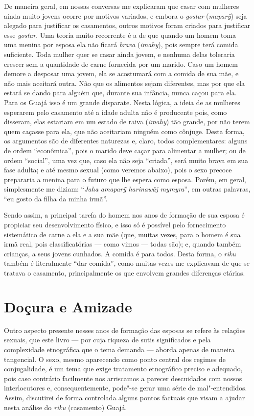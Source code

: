 De maneira geral, em nossas conversas me explicaram que casar com
mulheres ainda muito jovens ocorre por motivos variados, e embora o
\emph{gostar} (\emph{maparỹ}) seja alegado para justificar os
casamentos, outros motivos foram criados para justificar esse
\emph{gostar}. Uma teoria muito recorrente é a de que quando um homem
toma uma menina por esposa ela não ficará \emph{brava} (\emph{imahy}),
pois sempre terá comida suficiente. Toda mulher quer se casar ainda
jovem, e nenhuma delas toleraria crescer sem a quantidade de carne
fornecida por um marido. Caso um homem demore a desposar uma jovem, ela
se acostumará com a comida de sua mãe, e não mais aceitará outra. Não
que os alimentos sejam diferentes, mas por que ela estará se dando para
alguém que, durante sua infância, nunca caçou para ela. Para os Guajá
isso é um grande disparate. Nesta lógica, a ideia de as mulheres
esperarem pelo casamento até a idade adulta não é producente pois, como
disseram, elas estariam em um estado de raiva (\emph{imahy}) tão grande,
por não terem quem caçasse para ela, que não aceitariam ninguém como
cônjuge. Desta forma, os argumentos são de diferentes naturezas e,
claro, todos complementares: alguns de ordem ``econômica'', pois o marido
deve caçar para alimentar a mulher; ou de ordem ``social'', uma vez que,
caso ela não seja ``criada'', será muito brava em sua fase adulta; e até
mesmo sexual (como veremos abaixo), pois o sexo precoce prepararia a
menina para o futuro que lhe espera como esposa. Porém, em geral,
simplesmente me diziam: ``\emph{Jaha} \emph{amaparỹ} \emph{harinawãj}
\emph{mymyra}'', em outras palavras, ``eu gosto da filha da minha irmã''.

Sendo assim, a principal tarefa do homem nos anos de formação de sua
esposa é propiciar seu desenvolvimento físico, e isso só é possível pelo
fornecimento sistemático de carne a ela e a sua mãe (que, muitas vezes,
para o homem é sua irmã real, pois classificatórias --- como vimos --- todas
são); e, quando também crianças, a seus jovens cunhados. A comida é para
todos. Desta forma, o \emph{riku} também é literalmente ``dar comida'',
como muitas vezes me explicavam de que se tratava o casamento,
principalmente os que envolvem grandes diferenças etárias.

\section{Doçura e Amizade}\label{douxe7ura-e-amizade}

Outro aspecto presente nesses anos de formação das esposas se refere às
relações sexuais, que este livro --- por cuja riqueza de sutis
significados e pela complexidade etnográfica que o tema demanda --- aborda
apenas de maneira tangencial. O sexo, mesmo aparecendo como ponto
central dos regimes de conjugalidade, é um tema que exige tratamento
etnográfico preciso e adequado, pois caso contrário facilmente nos
arriscamos a parecer descuidados com nossos interlocutores e,
consequentemente, pode"-se gerar uma série de mal"-entendidos. Assim,
discutirei de forma controlada alguns pontos factuais que visam a ajudar
nesta análise do \emph{riku} (casamento) Guajá.

